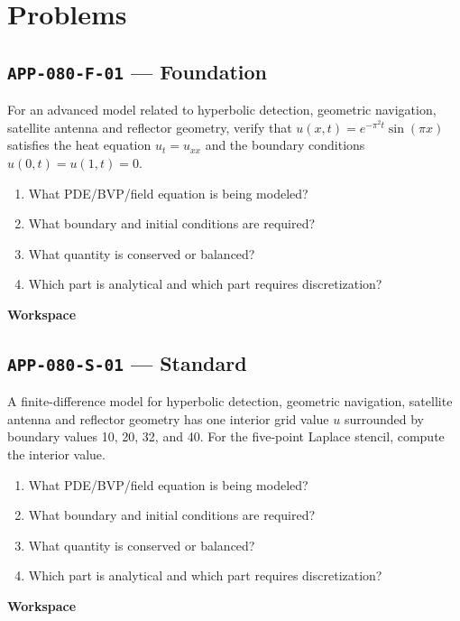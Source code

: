 \documentclass[11pt]{book}
\newcommand{\pid}[1]{\texttt{#1}}
\newcommand{\workspace}{\par\vspace{0.7in}\hrulefill\par\vspace{0.55in}\hrulefill\par}
\begin{document}
\section*{Problems}
\subsection*{\pid{APP-080-F-01} — Foundation}
\begin{problembox}
For an advanced model related to hyperbolic detection, geometric navigation, satellite antenna and reflector geometry, verify that $u(x,t)=e^{-\pi^2t}\sin(\pi x)$ satisfies the heat equation $u_t=u_{xx}$ and the boundary conditions $u(0,t)=u(1,t)=0$.
\end{problembox}
\begin{promptbox}\begin{enumerate}
\item What PDE/BVP/field equation is being modeled?
\item What boundary and initial conditions are required?
\item What quantity is conserved or balanced?
\item Which part is analytical and which part requires discretization?
\end{enumerate}\end{promptbox}
\textbf{Workspace}\workspace
{}
\subsection*{\pid{APP-080-S-01} — Standard}
\begin{problembox}
A finite-difference model for hyperbolic detection, geometric navigation, satellite antenna and reflector geometry has one interior grid value $u$ surrounded by boundary values 10, 20, 32, and 40. For the five-point Laplace stencil, compute the interior value.
\end{problembox}
\begin{promptbox}\begin{enumerate}
\item What PDE/BVP/field equation is being modeled?
\item What boundary and initial conditions are required?
\item What quantity is conserved or balanced?
\item Which part is analytical and which part requires discretization?
\end{enumerate}\end{promptbox}
\textbf{Workspace}\workspace
{}
\end{document}
